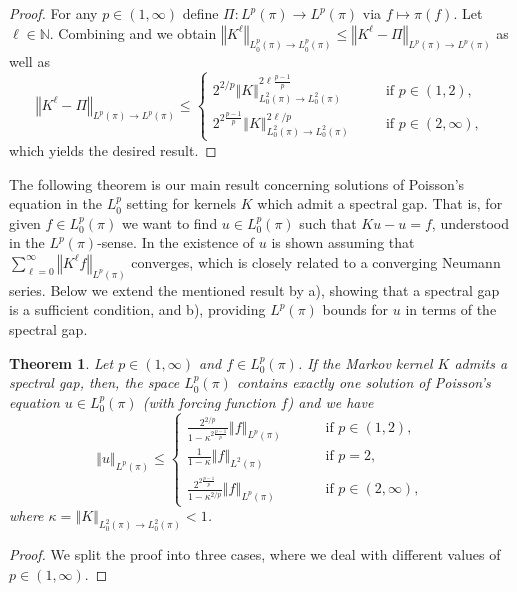 \documentclass[12pt]{article}
\theoremstyle{plain}
\newtheorem{thm}{Theorem}[section]
\newcommand{\norm}[1]{\left\Vert #1 \right\Vert}
\newcommand{\N}{\mathbb{N}}
\begin{document}
{\begin{proof}
	For any $p \in (1, \infty)$ define $\Pi \colon L^p(\pi) \to L^p(\pi)$ via $f \mapsto \pi(f)$. 
	Let $\ell \in \N$. 
	Combining \cite[Lemma 3.16]{rudolf2012explicit} and \cite[Proposition 3.17]{rudolf2012explicit} we obtain $	\norm{K^\ell}_{L^p_0(\pi) \to L^p_0(\pi)} \leq \norm{K^\ell-\Pi}_{L^p(\pi) \to L^p(\pi)}$ as well as
	\[
 \norm{K^\ell-\Pi}_{L^p(\pi) \to L^p(\pi)}
	\leq \begin{cases}
		2^{2/p} \norm{K}_{L^2_0(\pi) \to L^2_0(\pi)}^{2\ell \frac{p-1}{p}} \qquad &\text{ if } p\in (1,2),\\
		2^{2\frac{p-1}{p}} \norm{K}_{L^2_0(\pi) \to L^2_0(\pi)}^{2\ell/p} &\text{ if } p \in (2,\infty),
	\end{cases}
	\]
	which yields the desired result. 
\end{proof}

The following theorem is our main result concerning solutions of Poisson's equation in the $L^p_0$ setting for kernels $K$ which admit a spectral gap.
That is, for given $f \in L^p_0(\pi)$ we want to find $u \in L^p_0(\pi)$ such that $Ku - u = f$, understood in the $L^p(\pi)$-sense. 
In \cite[Proposition 21.3.8]{douc2018markov} the existence of $u$ is shown assuming that $\sum_{\ell=0}^\infty \norm{K^\ell f}_{L^p(\pi)}$ converges, which is closely related to a converging Neumann series.
Below we extend the mentioned result by a), showing that a spectral gap is a sufficient condition, and b), providing $L^p(\pi)$ bounds for $u$ in terms of the spectral gap.

\begin{thm}\label{thm:poisson_equation_spectral_gap_general}
Let $p \in (1,\infty)$ and $f \in L^p_0(\pi)$. 
If the Markov kernel $K$ admits a spectral gap, then, the space $L^p_0(\pi)$ contains exactly one solution of Poisson's equation $u \in L^p_0(\pi)$ (with forcing function $f$) and we have 
\[
\norm{u}_{L^p(\pi)}
\leq 
\begin{cases}
	\frac{2^{2/p}}{1- \kappa^{2\frac{p-1}{p}}} \norm{f}_{L^p(\pi)} \qquad&\text{ if } p \in (1,2), \\[1.5ex]
	\frac{1}{1-\kappa} \norm{f}_{L^2(\pi)} &\text{ if } p = 2, \\[1.2ex]
	\frac{2^{2\frac{p-1}{p}}}{1-\kappa^{2/p}}\norm{f}_{L^p(\pi)} &\text{ if } p\in (2, \infty),
\end{cases}
\] 
where $\kappa = \norm{K}_{L^2_0(\pi) \to L^2_0(\pi)}< 1$. 
\end{thm}

\begin{proof}
We split the proof into three cases, where we deal with different values of $p \in(1, \infty)$.


\end{proof}}
\end{document}
